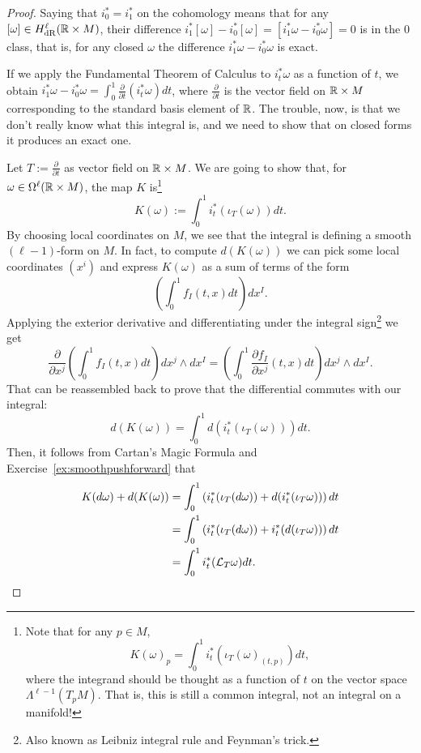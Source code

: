 \begin{proof}
	Saying that  $i_0^* = i_1^*$ on the cohomology means that for any $[\omega]\in H_{\mathrm{dR}}^\ell(\mathbb{R}\times M)$, their difference $i_1^*[\omega] - i_0^*[\omega] = [i_1^*\omega - i_0^*\omega] = 0$ is in the $0$ class, that is, for any closed $\omega$ the difference $i_1^*\omega - i_0^*\omega$ is exact.

	If we apply the Fundamental Theorem of Calculus to $i^*_t\omega$ as a function of $t$, we obtain $i_1^*\omega - i_0^*\omega = \int_0^1 \frac{\partial}{\partial t} (i^*_t \omega) dt$,
	where $\frac{\partial}{\partial t}$ is the vector field on $\mathbb{R}\times M$ corresponding to the standard basis element of $\mathbb{R}$.
	The trouble, now, is that we don't really know what this integral is, and we need to show that on closed forms it produces an exact one.

	Let $T:=\frac{\partial}{\partial t}$ as vector field on $\mathbb{R}\times M$.
	We are going to show that, for $\omega\in\Omega^\ell(\mathbb{R}\times M)$, the map $K$ is\footnote{Note that for any $p\in M$,
		\begin{equation}
			K(\omega)_p = \int_0^1 i_t^*(\iota_T(\omega)_{(t,p)})dt,
		\end{equation}
		where the integrand should be thought as a function of $t$ on the vector space $\Lambda^{\ell-1}(T_pM)$.
		That is, this is still a common integral, not an integral on a manifold!}
	\begin{equation}
		K(\omega) := \int_0^1 i^*_t(\iota_T(\omega)) dt.
	\end{equation}
	By choosing local coordinates on $M$, we see that the integral is defining a smooth $(\ell-1)$-form on $M$.
	In fact, to compute $d(K(\omega))$ we can pick some local coordinates $(x^i)$ and express $K(\omega)$ as a sum of terms of the form
	\begin{equation}
		\left(\int_0^1 f_I(t,x) dt\right)dx^I.
	\end{equation}
	Applying the exterior derivative and differentiating under the integral sign\footnote{Also known as Leibniz integral rule and Feynman's trick.} we get
	\begin{equation}
		\frac{\partial}{\partial x^j}\left(\int_0^1 f_I(t,x) dt\right)dx^j\wedge dx^I = \left(\int_0^1 \frac{\partial f_I}{\partial x^j}(t,x) dt\right)dx^j\wedge dx^I.
	\end{equation}
	That can be reassembled back to prove that the differential commutes with our integral:
	\begin{equation}
		d(K(\omega)) = \int_0^1 d(i_t^*(\iota_T(\omega)))dt.
	\end{equation}
	Then, it follows from Cartan's Magic Formula and Exercise~\ref{ex:smoothpushforward} that
	\begin{align}
		K(d\omega) + d(K(\omega))
		 & = \int_0^1\left( i_t^*(\iota_T(d\omega)) + d (i_t^*(\iota_T\omega)) \right) dt \\
		 & = \int_0^1\left( i_t^*(\iota_T(d\omega)) + i_t^* (d(\iota_T\omega)) \right) dt \\
		 & = \int_0^1 i_t^*(\mathcal{L}_T\omega) dt.
	\end{align}


\end{proof}
